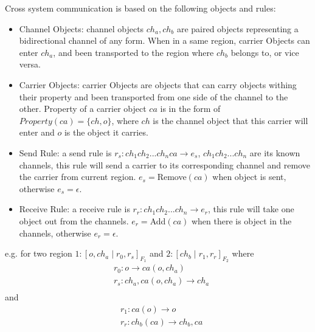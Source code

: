 \documentclass[9pt,a4paper,twoside]{article}
\begin{document}
            Cross system communication is based on the following objects and rules:
            \begin{itemize}
                \item Channel Objects: channel objects $ch_a, ch_b$ are paired objects representing a bidirectional channel of any form. When in a same region, carrier Objects can enter $ch_a$, and been transported to the region where $ch_b$ belongs to, or vice versa.
                \item Carrier Objects: carrier Objects are objects that can carry objects withing their property and been transported from one side of the channel to the other. Property of a carrier object $ca$ is in the form of $Property(ca)=\{ ch, o\}$, where $ch$ is the channel object that this carrier will enter and $o$ is the object it carries.
                \item Send Rule: a send rule is $r_s: ch_1ch_2...ch_nca \rightarrow e_s$, $ch_1ch_2...ch_n$ are its known channels, this rule will send a carrier to its corresponding channel and remove the carrier from current region. $e_s = $Remove$(ca)$ when object is sent, otherwise $e_s=\epsilon$. 
                \item Receive Rule: a receive rule is $r_r: ch_1ch_2...ch_n \rightarrow e_r$, this rule will take one object out from the channels. $e_r = $Add$(ca)$ when there is object in the channels, otherwise $e_r=\epsilon$. 
            \end{itemize}

            e.g. for two region $1:[o,ch_a \mid r_0,r_s]_{F_1}$ and $2:[ ch_b \mid r_1,r_r]_{F_2}$
            where
            \begin{equation}
                \begin{aligned}
                    &r_0: o \rightarrow ca(o,ch_a) \\
                    &r_s: ch_a,ca(o,ch_a) \rightarrow ch_a \\
                \end{aligned}
            \end{equation}
            and 
            \begin{equation}
             \begin{aligned}
                    &r_1: ca(o) \rightarrow o \\
                    &r_r: ch_b(ca) \rightarrow ch_b,ca\\
                \end{aligned}
            \end{equation}
\end{document}
